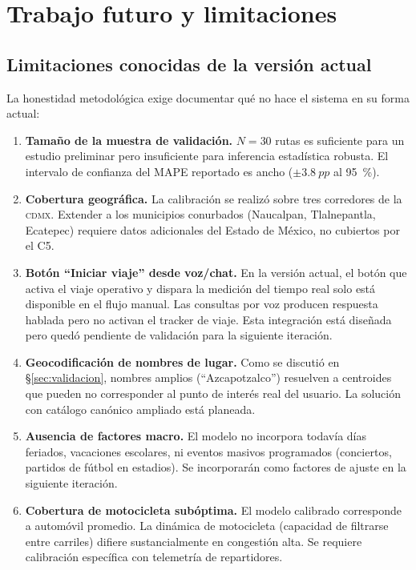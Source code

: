 \documentclass[11pt,a4paper]{article}
\newcommand{\CDMX}{\textsc{cdmx}}
\begin{document}
\section{Trabajo futuro y limitaciones}
\label{sec:futuro}

\subsection{Limitaciones conocidas de la versión actual}

La honestidad metodológica exige documentar qué no hace el
sistema en su forma actual:

\begin{enumerate}
\item \textbf{Tamaño de la muestra de validación.} $N=\num{30}$
rutas es suficiente para un estudio preliminar pero insuficiente
para inferencia estadística robusta. El intervalo de confianza
del MAPE reportado es ancho ($\pm\SI{3.8}{pp}$ al
\SI{95}{\percent}).
\item \textbf{Cobertura geográfica.} La calibración se realizó
sobre tres corredores de la \CDMX. Extender a los municipios
conurbados (Naucalpan, Tlalnepantla, Ecatepec) requiere datos
adicionales del Estado de México, no cubiertos por el C5.
\item \textbf{Botón ``Iniciar viaje'' desde voz/chat.} En la
versión actual, el botón que activa el viaje operativo y dispara
la medición del tiempo real solo está disponible en el flujo
manual. Las consultas por voz producen respuesta hablada pero no
activan el tracker de viaje. Esta integración está diseñada pero
quedó pendiente de validación para la siguiente iteración.
\item \textbf{Geocodificación de nombres de lugar.} Como se
discutió en \S\ref{sec:validacion}, nombres amplios
(``Azcapotzalco'') resuelven a centroides que pueden no
corresponder al punto de interés real del usuario. La solución
con catálogo canónico ampliado está planeada.
\item \textbf{Ausencia de factores macro.} El modelo no
incorpora todavía días feriados, vacaciones escolares, ni
eventos masivos programados (conciertos, partidos de fútbol en
estadios). Se incorporarán como factores de ajuste en la
siguiente iteración.
\item \textbf{Cobertura de motocicleta subóptima.} El modelo
calibrado corresponde a automóvil promedio. La dinámica de
motocicleta (capacidad de filtrarse entre carriles) difiere
sustancialmente en congestión alta. Se requiere calibración
específica con telemetría de repartidores.
\end{enumerate}
\end{document}
